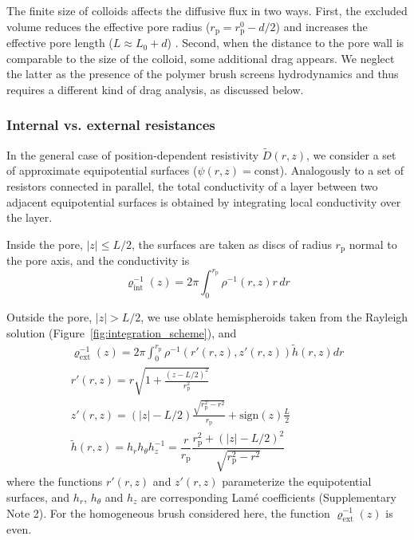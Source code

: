 \documentclass[12pt, a4paper]{article}
\begin{document}
The finite size of colloids affects the diffusive flux in two ways.
First, the excluded volume reduces the effective pore radius ($r_{\text{p}} = r_{\text{p}}^0 - d/2$) and increases the effective pore length ($L \approx L_0 + d$) \cite{Brenner1977}.
Second, when the distance to the pore wall is comparable to the size of the colloid, some additional drag appears\cite{Faxen1922, Haberman1958}.
We neglect the latter as the presence of the polymer brush screens hydrodynamics and thus requires a different kind of drag analysis, as discussed below.


\subsubsection{Internal vs. external resistances}

In the general case of position-dependent resistivity $\tilde{D}(r,z)$, we consider a set of approximate equipotential surfaces ($\psi(r,z)=\text{const}$).
Analogously to a set of resistors connected in parallel, the total conductivity of a layer between two adjacent equipotential surfaces is obtained by integrating local conductivity over the layer.

Inside the pore, $|z| \leq L/2$, the surfaces are taken as discs of radius $r_{\text{p}}$ normal to the pore axis, and the conductivity is
\begin{equation}
\varrho_{\text{int}}^{-1}(z)= 2\pi\int_{0}^{r_{\text{p}}^{}} \rho^{-1}(r,z) r \, dr
\label{eq:varrho1}
\end{equation}

Outside the pore, $|z| > L/2$, we use oblate hemispheroids taken from the Rayleigh solution \cite{Strutt1878} (Figure~\ref{fig:integration_scheme}), and
\begin{equation}
    \begin{gathered}
        \varrho_{\text{ext}}^{-1}(z)= 2\pi\int_{0}^{r_{\text{p}}^{}} \rho^{-1}\left( r'(r,z), z'(r,z) \right)  \tilde{h} (r,z) dr\\
        r'(r,z) = r\sqrt{1 + \frac{(z - L/2)^2}{r_{\text{p}}^2}}\\
        z'(r,z) = (|z| - L/2) \frac{\sqrt{r_{\text{p}}^2 - r^2}}{r_{\text{p}}} +  \text{sign}(z) \frac{L}{2}\\
        \tilde{h} (r,z) = h_r h_{\theta} h_z^{-1} = \dfrac{r}{r_{\text{p}}}\dfrac{r_{\text{p}}^2 + (|z|-L/2)^2}{\sqrt{r_{\text{p}}^2 - r^2}}
    \end{gathered}
\label{eq:varrho2}
\end{equation}
where the functions $r'(r,z)$ and $z'(r,z)$ parameterize the equipotential surfaces, and $h_r$, $h_{\theta}$ and $h_z$ are corresponding Lam\'e coefficients (Supplementary Note 2). 
For the homogeneous brush considered here, the function $\varrho_{\text{ext}}^{-1}(z)$ is even.
\end{document}
